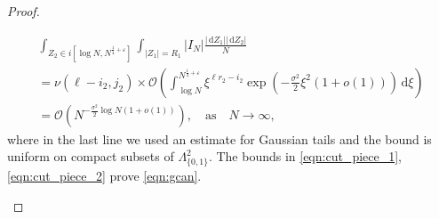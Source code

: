 \documentclass[11pt]{article}
\theoremstyle{plain}
\theoremstyle{definition}
\numberwithin{equation}{section}
\renewcommand{\d}{\,\mathrm{d}}
\begin{document}
\begin{proof}
\begin{enumerate}
\begin{multline}
\int_{Z_2\in i[\log N,N^{\frac{1}{4}+\varepsilon}]}\int_{|Z_1|=R_1} |I_N| \frac{|\d Z_1| |\d Z_2|}{N}
\\= 
\nu(\ell-i_2,j_2)
%
\times\mathcal{O}
\left(
%
\int_{\log N}^{N^{\frac{1}{4}+\varepsilon}}\xi^{\ell r_2-i_2} \exp\left(-\frac{\sigma^2}{2}\xi^2(1+o(1)) \right) \d \xi
\right)
\\=%
\mathcal{O}(N^{-\frac{\sigma^2}{2} \log N(1+o(1))}),\quad \text{as}\quad N\rightarrow\infty,
\end{multline}
where in the last line we used an estimate for Gaussian tails and the bound is uniform on compact subsets of $\Lambda_{\{0,1\}}^2$. 
%
%
The bounds in \eqref{eqn:cut_piece_1}, \eqref{eqn:cut_piece_2} prove \eqref{eqn:gcan}. 
\end{enumerate}
\end{proof}
\end{document}
